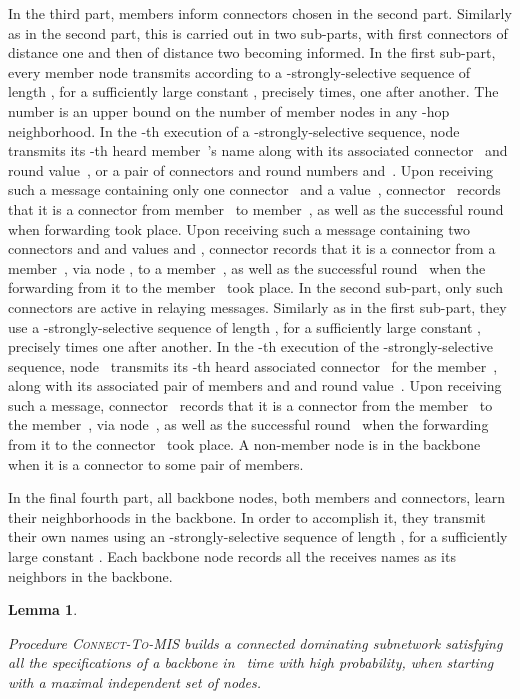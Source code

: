 \documentclass[11pt]{article}
\newtheorem{lemma}{Lemma}
\begin{document}
In the third part, members inform connectors chosen in the second part. 
Similarly as in the second part, this is carried out in two sub-parts, with first connectors of distance one and then of distance two becoming informed.
In the first sub-part, every member node  transmits according to a -strongly-selective sequence of length ,  for a sufficiently large constant , precisely  times, one after another. 
The number  is an upper bound on the number of member nodes in any -hop neighborhood.
In the -th execution of a -strongly-selective sequence, node  transmits its -th heard member~'s name  along with its associated connector~ and round value~, or a pair of connectors  and round numbers  and~.
Upon receiving such a message containing only one connector~ and a value~, connector~ records that it is a connector from member~ to member~, as well as the successful round~ when forwarding took place.
Upon receiving such a message containing two connectors  and  and  values  and , connector  records that it is a connector from a member~, via node , to a member~, as well as the successful round~ when the forwarding  from it to the member~ took place.
In the second sub-part, only such connectors  are active in relaying messages.
Similarly as in the first sub-part, they use a -strongly-selective sequence of length , for a sufficiently large constant , precisely  times one after another.
In the -th execution of the -strongly-selective sequence, node~ transmits its -th heard associated connector~ for the member~, along with its associated pair of members  and   and round value~. 
Upon receiving such a message, connector~ records that it is a connector from the member~ to the member~, via node~, as well as the successful round~ when the forwarding  from it to the connector~ took place.
A non-member node is in the backbone when it  is a connector to some pair of members.

In the final fourth part, all backbone nodes, both members and connectors,  learn their neighborhoods in the backbone.
In order to accomplish it, they transmit their own names using an -strongly-selective sequence of length , for a sufficiently large constant . 
Each backbone node records all the receives names as its neighbors in the backbone.




\begin{lemma}
\label{lem:connect-to-mis}

Procedure \textsc{Connect-To-MIS} builds a connected dominating subnetwork satisfying all the specifications of a backbone in~ time with high probability, when starting with a maximal independent set of nodes.
\end{lemma}
\end{document}

